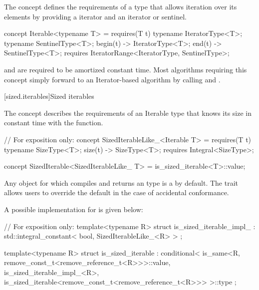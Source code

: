 \begin{addedblock}
\pnum
The  concept defines the requirements of a type that allows
iteration over its elements by providing a  iterator and an
 iterator or sentinel.

\begin{codeblock}
concept Iterable<typename T> =
    requires(T t) {
        typename IteratorType<T>;
        typename SentinelType<T>;
        { begin(t) } -> IteratorType<T>;
        { end(t) } -> SentinelType<T>;
        requires IteratorRange<IteratorType, SentinelType>;
    }
\end{codeblock}

 and  are required to be amortized constant time.
\enternote Most algorithms requiring this concept simply forward to an
Iterator-based algorithm by calling  and . \exitnote

[sized.iterables]{Sized iterables}

\pnum
The  concept describes the requirements of an Iterable
type that knows its size in constant time with the  function.

\begin{codeblock}
// For exposition only:
concept SizedIterableLike_<Iterable T> =
    requires(T t) {
        typename SizeType<T>;
        { size(t) } -> SizeType<T>;
        requires Integral<SizeType>;
    }

concept SizedIterable<SizedIterableLike_ T> =
    is_sized_iterable<T>::value;
\end{codeblock}

\pnum
Any  object  for which  compiles and
returns an  type is a  by default. The
 trait allows users to override the default in the
case of accidental conformance.

\enternote
A possible implementation for  is given below:

\begin{codeblock}
// For exposition only:
template<typename R>
struct is_sized_iterable_impl_
  : std::integral_constant< bool, SizedIterableLike_<R> >
{};

template<typename R>
struct is_sized_iterable
  : conditional<
        is_same<R, remove_const_t<remove_reference_t<R>>>::value,
        is_sized_iterable_impl_<R>,
        is_sized_iterable<remove_const_t<remove_reference_t<R>>>
    >::type
{};
\end{codeblock}
\exitnote


\end{addedblock}

